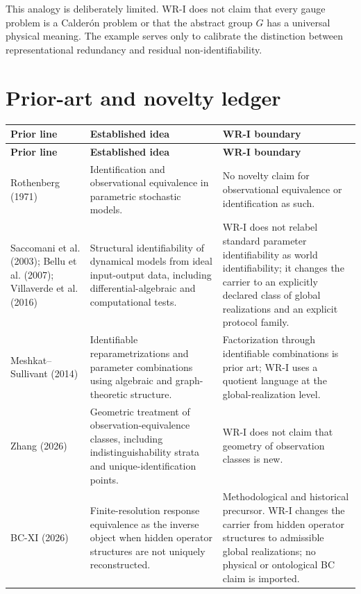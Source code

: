 \documentclass[11pt]{article}
\begin{document}
This analogy is deliberately limited. WR-I does not claim that every gauge
problem is a Calder\'on problem or that the abstract group $G$ has a universal
physical meaning. The example serves only to calibrate the distinction between
representational redundancy and residual non-identifiability.

\section{Prior-art and novelty ledger}

\begin{longtable}{>{\raggedright\arraybackslash}p{}
                  >{\raggedright\arraybackslash}p{}
                  >{\raggedright\arraybackslash}p{}}
\toprule
\textbf{Prior line} & \textbf{Established idea} & \textbf{WR-I boundary} \\
\midrule
\endfirsthead
\toprule
\textbf{Prior line} & \textbf{Established idea} & \textbf{WR-I boundary} \\
\midrule
\endhead

Rothenberg (1971) &
Identification and observational equivalence in parametric stochastic models. &
No novelty claim for observational equivalence or identification as such. \\[5pt]

Saccomani et al. (2003); Bellu et al. (2007); Villaverde et al. (2016) &
Structural identifiability of dynamical models from ideal input-output data,
including differential-algebraic and computational tests. &
WR-I does not relabel standard parameter identifiability as world
identifiability; it changes the carrier to an explicitly declared class of
global realizations and an explicit protocol family. \\[5pt]

Meshkat--Sullivant (2014) &
Identifiable reparametrizations and parameter combinations using algebraic and
graph-theoretic structure. &
Factorization through identifiable combinations is prior art; WR-I uses a
quotient language at the global-realization level. \\[5pt]

Zhang (2026) &
Geometric treatment of observation-equivalence classes, including
indistinguishability strata and unique-identification points. &
WR-I does not claim that geometry of observation classes is new. \\[5pt]

BC-XI (2026) &
Finite-resolution response equivalence as the inverse object when hidden
operator structures are not uniquely reconstructed. &
Methodological and historical precursor. WR-I changes the carrier from hidden
operator structures to admissible global realizations; no physical or
ontological BC claim is imported. \\[5pt]


\end{longtable}
\end{document}
